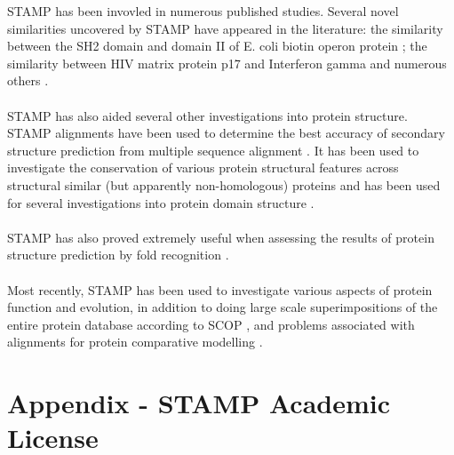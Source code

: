 STAMP has been invovled in numerous published studies.  
Several novel similarities uncovered by STAMP have appeared 
in the literature: the similarity between the SH2 domain 
and domain II of E. coli biotin operon protein \cite{rb93b}; the 
similarity between HIV matrix protein p17 and Interferon 
gamma \cite{matthews94} and numerous others \cite{russell94,russell96,russell97a}.\\
\\
STAMP has also aided several other investigations 
into protein structure.  STAMP alignments have been used to 
determine the best accuracy of secondary structure prediction 
from multiple sequence alignment \cite{rb93c}. It has been used to 
investigate the conservation of various protein structural features 
across  structural similar (but apparently non-homologous) proteins 
\cite{rb94,russell97b} and has been used for several investigations into protein domain 
structure \cite{russell94,sternberg95,siddiqui95}.\\
\\
STAMP has also proved extremely useful when assessing the results of
protein structure prediction by fold recognition 
\cite{rcb95a,rcb96,russell98b}.\\
\\
Most recently, STAMP has been used to investigate various aspects of protein function 
and evolution, in addition to doing large scale superimpositions of the entire
protein database according to SCOP \cite{russell97b,russell98a}, and problems
associated with alignments for protein comparative modelling 
\cite{saqi98}.

\chapter{Appendix - STAMP Academic License}

